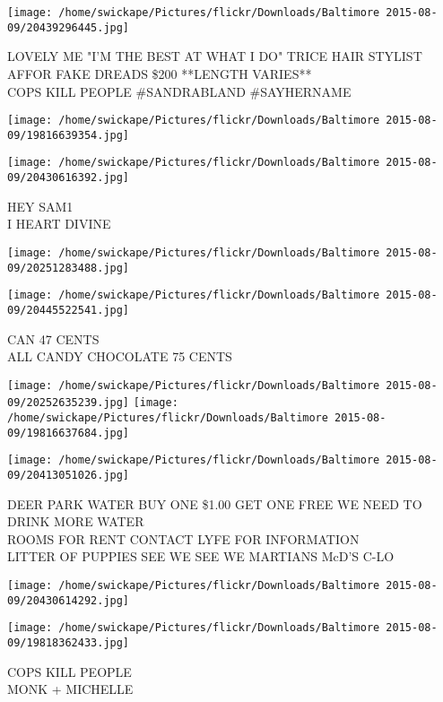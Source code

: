 \documentclass[10pt,letterpaper]{article}
\begin{document}
\vspace{0.25in}
\texttt{[image: /home/swickape/Pictures/flickr/Downloads/Baltimore 2015-08-09/20439296445.jpg]}

LOVELY ME "I'M THE BEST AT WHAT I DO" TRICE HAIR STYLIST\\
AFFOR FAKE DREADS \$200 **LENGTH VARIES**\\
COPS KILL PEOPLE \#SANDRABLAND \#SAYHERNAME
\pagebreak

\texttt{[image: /home/swickape/Pictures/flickr/Downloads/Baltimore 2015-08-09/19816639354.jpg]}

\vspace{0.25in}
\texttt{[image: /home/swickape/Pictures/flickr/Downloads/Baltimore 2015-08-09/20430616392.jpg]}

HEY SAM1\\
I HEART DIVINE
\pagebreak

\texttt{[image: /home/swickape/Pictures/flickr/Downloads/Baltimore 2015-08-09/20251283488.jpg]}

\vspace{0.25in}
\texttt{[image: /home/swickape/Pictures/flickr/Downloads/Baltimore 2015-08-09/20445522541.jpg]}

CAN 47 CENTS\\
ALL CANDY CHOCOLATE 75 CENTS
\pagebreak

\texttt{[image: /home/swickape/Pictures/flickr/Downloads/Baltimore 2015-08-09/20252635239.jpg]}
\texttt{[image: /home/swickape/Pictures/flickr/Downloads/Baltimore 2015-08-09/19816637684.jpg]}

\texttt{[image: /home/swickape/Pictures/flickr/Downloads/Baltimore 2015-08-09/20413051026.jpg]}

DEER PARK WATER BUY ONE \$1.00 GET ONE FREE WE NEED TO DRINK MORE WATER\\
ROOMS FOR RENT CONTACT LYFE FOR INFORMATION\\
LITTER OF PUPPIES SEE WE SEE WE MARTIANS McD'S C{-}LO
\pagebreak

\texttt{[image: /home/swickape/Pictures/flickr/Downloads/Baltimore 2015-08-09/20430614292.jpg]}

\vspace{0.25in}
\texttt{[image: /home/swickape/Pictures/flickr/Downloads/Baltimore 2015-08-09/19818362433.jpg]}

COPS KILL PEOPLE\\
MONK + MICHELLE
\pagebreak
\end{document}
